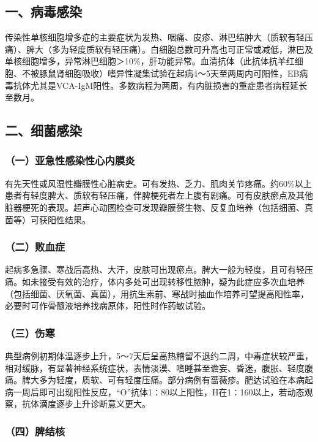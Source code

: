 \subsection{一、病毒感染}

传染性单核细胞增多症的主要症状为发热、咽痛、皮疹、淋巴结肿大（质软有轻压痛）、脾大（多为轻度质软有轻压痛）。白细胞总数可升高也可正常或减低，淋巴及单核细胞增多，异常淋巴细胞＞10\%，肝功能异常。血清抗体（此抗体抗羊红细胞、不被豚鼠肾细胞吸收）嗜异性凝集试验在起病4～5天至两周内可阳性，EB病毒抗体尤其是VCA-IgM阳性。多数病程为两周，有内脏损害的重症患者病程延长至数月。

\subsection{二、细菌感染}

\subsubsection{（一）亚急性感染性心内膜炎}

有先天性或风湿性瓣膜性心脏病史。可有发热、乏力、肌肉关节疼痛。约60\%以上患者有轻度脾大、质软有轻压痛，伴脾梗死者左上腹有剧痛。可有皮肤瘀点及其他脏器梗死的表现。超声心动图检查可发现瓣膜赘生物、反复血培养（包括细菌、真菌等）可获阳性结果。

\subsubsection{（二）败血症}

起病多急骤、寒战后高热、大汗，皮肤可出现瘀点。脾大一般为轻度，且可有轻压痛。如未接受有效的治疗，体内多处可出现转移性脓肿，疑为此症应多次血培养（包括细菌、厌氧菌、真菌），用抗生素前、寒战时抽血作培养可望提高阳性率，必要时可作骨髓液培养找病原体，阳性时作药敏试验。

\subsubsection{（三）伤寒}

典型病例初期体温逐步上升，5～7天后呈高热稽留不退约二周，中毒症状较严重，相对缓脉，有显著神经系统症状，表情淡漠、嗜睡甚至谵妄、昏迷，腹胀、轻度腹痛。脾大多为轻度，质软、可有轻度压痛。部分病例有蔷薇疹。肥达试验在本病起病一周后即可出现阳性反应，“O”抗体1∶80以上阳性，H在1∶160以上，若动态观察，抗体滴度逐步上升诊断意义更大。

\subsubsection{（四）脾结核}

